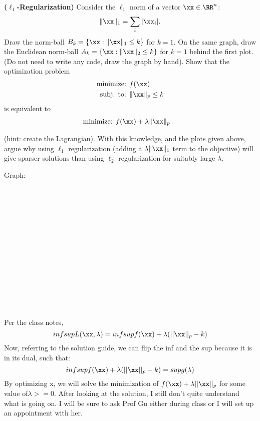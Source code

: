 \documentclass[12pt,letterpaper,fleqn]{hmcpset}
\begin{document}
\begin{problem}[2]
\textbf{($\ell_1$-Regularization)} Consider the $\ell_1$ norm of a vector $\xx\in\RR^n$:
\[
    \|\xx\|_1 = \sum_i |\xx_i|.
\]
Draw the norm-ball $B_k = \{\xx : \|\xx\|_1 \leq k\}$ for $k=1$. On the same graph, draw the Euclidean norm-ball $A_k = \{\xx : \|\xx\|_2 \leq k\}$ for $k=1$ behind the first plot. (Do not need to write any code, draw the graph by hand).
\newline
\newline
Show that the optimization problem
\begin{align*}
    \text{minimize: } & f(\xx)\\
    \text{subj. to: } & \|\xx\|_p \leq k
\end{align*}
is equivalent to
\begin{align*}
    \text{minimize: } & f(\xx) + \lambda\|\xx\|_p
\end{align*}

(hint: create the Lagrangian). With this knowledge, and the plots given above, argue why
using $\ell_1$ regularization (adding a $\lambda\|\xx\|_1$ term to the objective) will give
sparser solutions than using $\ell_2$ regularization for suitably large $\lambda$.
\end{problem}
\begin{solution}
Graph:
\\
\\
\\
\\ \\ \\ \\ \\
\\
\\
\\
\\
\\
\\
\\
Per the class notes, \[ inf sup L(\xx, \lambda) = inf sup f(\xx) + \lambda(||\xx||_p - k) \]
Now, referring to the solution guide, we can flip the inf and the sup because it is in its dual, such that: 
 \[ inf sup f(\xx) + \lambda(||\xx||_p - k) = sup g(\lambda) \]
 By optimizing x, we will solve the minimization of $f(\xx) + \lambda||\xx||_p $ for some value of$ \lambda >= 0. $
 After looking at the solution, I still don't quite understand what is going on. I will be sure to ask Prof Gu either during class or I will set up an appointment with her.
\end{solution}
\end{document}
